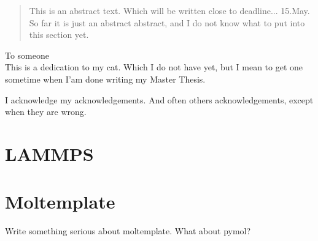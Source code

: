 \documentclass[twoside,english]{uiofysmaster}
\begin{document}

\cleardoublepage
\begin{abstract}
This is an abstract text. Which will be written close to deadline... 15.May. So far it is just an abstract abstract, and I do not know what to put into this section yet.
\end{abstract}

\begin{dedication}                                                    %
  To someone
  \\\vspace{12pt}
  This is a dedication to my cat. Which I do not have yet, but I mean to get one sometime when I'am done writing my Master Thesis.
\end{dedication}

\begin{acknowledgements}                                              %
  I acknowledge my acknowledgements. And often others acknowledgements, except when they are wrong.
\end{acknowledgements}

\tableofcontents

%

\chapter{LAMMPS}                                                      %


\chapter{Moltemplate}                                                 %
Write something serious about moltemplate. What about pymol?


\end{document}
